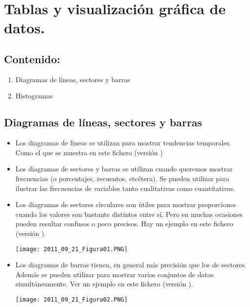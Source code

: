 \section{Tablas y visualización gráfica de datos.}

\subsection*{Contenido:}

\begin{enumerate}
 \item Diagramas de líneas, sectores y barras
 \item Histogramas
\end{enumerate}

\subsection{Diagramas de líneas, sectores y barras}

\begin{itemize}
     \item Los {\sf diagramas de líneas} se utilizan para mostrar tendencias temporales. Como el que se muestra en este fichero  (versión )

     \item Los diagramas de sectores y barras se utilizan cuando queremos mostrar frecuencias (o porcentajes, recuentos, etcétera). Se pueden utilizar para ilustrar las frecuencias de variables tanto cualitativas como cuantitativas.

     \item Los diagramas de {\sf sectores circulares} son útiles para mostrar proporciones cuando los valores son bastante distintos entre sí. Pero en muchas ocasiones pueden resultar confusos o poco precisos. Hay un ejemplo en este fichero  (versión ).
         \begin{center}
         \texttt{[image: 2011\_09\_21\_Figura01.PNG]}
         \end{center}
    \item Los {\sf diagramas de barras} tienen, en general más precisión que los de sectores. Además se pueden utilizar para mostrar varios conjuntos de datos simultáneamente. Ver un ejemplo en este fichero  (versión ).
        \begin{center}
        \texttt{[image: 2011\_09\_21\_Figura02.PNG]}
        \end{center}


\end{itemize}

